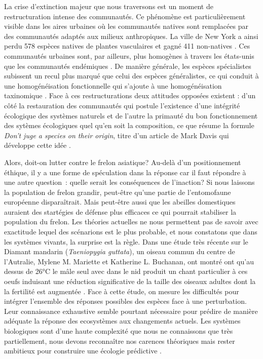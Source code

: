 La crise d'extinction majeur que nous traversons \citep{Thomas2004} est
un moment de restructuration intense des communautés. Ce phénomène est
particulièrement visible dans les aires urbaines où les communautés
natives sont remplacées par des communautés adaptés aux milieux
anthropiques. La ville de New York a ainsi perdu 578 espèces natives de
plantes vasculaires et gagné 411 non-natives \citep{McKinney2006}. Ces
communautés urbaines sont, par ailleurs, plus homogènes à travers les
états-unis que les communautés endémiques \citep{McKinney2006}. De
manière générale, les espèces spécialistes subissent un recul plus
marqué que celui des espèces généralistes, ce qui conduit à une
homogénéisation fonctionnelle qui s'ajoute à une homogénéisation
taxinomique \citep{Clavel2011}. Face à ces restructurations deux
attitudes opposées existent : d'un côté la restauration des communautés
qui postule l'existence d'une intégrité écologique des systèmes naturels
\citep{Suding2015} et de l'autre la primauté du bon fonctionnement des
sytèmes écologiques quel qu'en soit la composition, ce que résume la
formule \emph{Don't juge a species on their origin}, titre d'un article
de Mark Davis qui développe cette idée \citep{Davis2011}.

Alors, doit-on lutter contre le frelon asiatique? Au-delà d'un
positionnement éthique, il y a une forme de spéculation dans la réponse
car il faut répondre à une autre question~: quelle serait les
conséquences de l'inaction? Si nous laissons la population de frelon
grandir, peut-être qu'une partie de l'entomofaune européenne
disparaîtrait. Mais peut-être aussi que les abeilles domestiques
auraient des startégies de défense plus efficaces ce qui pourrait
stabiliser la population du frelon. Les théories actuelles ne nous
permettent pas de savoir avec exactitude lequel des scénarions est le
plus probable, et nous constatons que dans les systèmes vivants, la
surprise est la règle. Dans une étude très récente sur le Diamant
mandarin (\emph{Taeniopygia guttata}), un oiseau commun du centre de
l'Autralie, Mylene M. Mariette et Katherine L. Buchanan, ont montré ont
qu'au dessus de 26°C le mâle seul avec dans le nid produit un chant
particulier à ces oeufs induisant une réduction significative de la
taille des oiseaux adultes dont la la fertilité est augmentée
\citep{Mariette2016}. Face à cette étude, on mesure les difficultés pour
intégrer l'ensemble des réponses possibles des espèces face à une
perturbation. Leur connaissance exhaustive semble pourtant nécessaire
pour prédire de manière adéquate la réponse des ecosystèmes aux
changements actuels. Les systèmes biologiques sont d'une haute
complexité que nous ne connaissons que très partiellement, nous devons
reconnaître nos carences théoriques mais rester ambitieux pour
construire une écologie prédictive \citep{Mouquet2015}.

